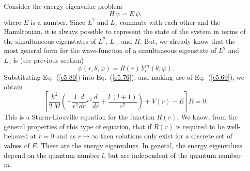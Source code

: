 Consider the energy eigenvalue problem
\begin{equation}
H\,\psi = E\,\psi,
\end{equation}
where $E$ is a number. Since $L^2$ and $L_z$ commute with each other and
the Hamiltonian, it is always possible to represent the state of the
system in terms of the simultaneous eigenstates of $L^2$, $L_z$, and $H$.
But, we already know that the most general form for the wave-function of
a simultaneous
eigenstate of $L^2$ and $L_z$ is (see previous section)
\begin{equation}\label{e5.80}
\psi(r, \theta, \varphi) = R(r) \,Y_l^m(\theta, \varphi).
\end{equation}
Substituting Eq.~(\ref{e5.80}) into Eq.~(\ref{e5.76}), and making use of Eq.~(\ref{e5.69}), we
obtain
\begin{equation}\label{e5.81}
\left[\frac{\hbar^2}{2\,M} \left(-\frac{1}{r^2} \frac{d}{dr}r^2\frac{d}{dr}
+\frac{l\,(l+1)}{r^2}\right) + V(r) - E\right] R = 0.
\end{equation}
This is a Sturm-Liouville equation for the function $R(r)$. We know,
from the general properties of this type of equation, 
that if $R(r)$ is required to be well-behaved  at $r=0$ and as $r\rightarrow
\infty$ then solutions only exist for a discrete set of values of $E$. These
are the energy eigenvalues. In general, the energy eigenvalues depend
on the quantum number $l$, but are independent of the quantum number $m$. 

